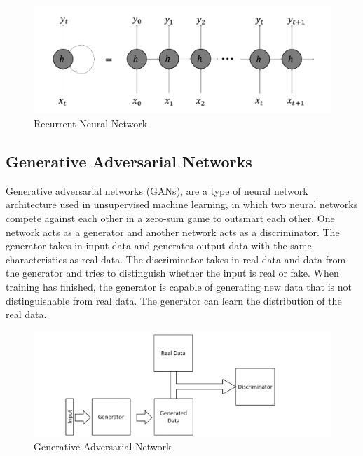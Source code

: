\documentclass[conference]{IEEEtran}
\begin{document}
\begin{figure}[ht]
\centering
\includegraphics[scale=0.175]{pictures/RNN.PNG}
\caption{Recurrent Neural Network}
\label{fig:rnn}
\end{figure}

\subsection{Generative Adversarial Networks}
\label{sec:gan}
Generative adversarial networks  (GANs), are a type of neural network architecture used in unsupervised machine learning, in which two neural networks compete against each other in a zero-sum game to outsmart each other. One network acts as a generator and another network acts as a discriminator. The generator takes in input data and generates output data with the same characteristics as real data. The discriminator takes in real data and data from the generator and tries to distinguish whether the input is real or fake. When training has finished, the generator is capable of generating new data that is not distinguishable from real data. The generator can learn the distribution of the real data. 

\begin{figure}[ht]
\centering
\includegraphics[scale=0.45]{pictures/GAN.PNG}
\caption{Generative Adversarial Network}
\label{fig:gan}
\end{figure}
\end{document}
